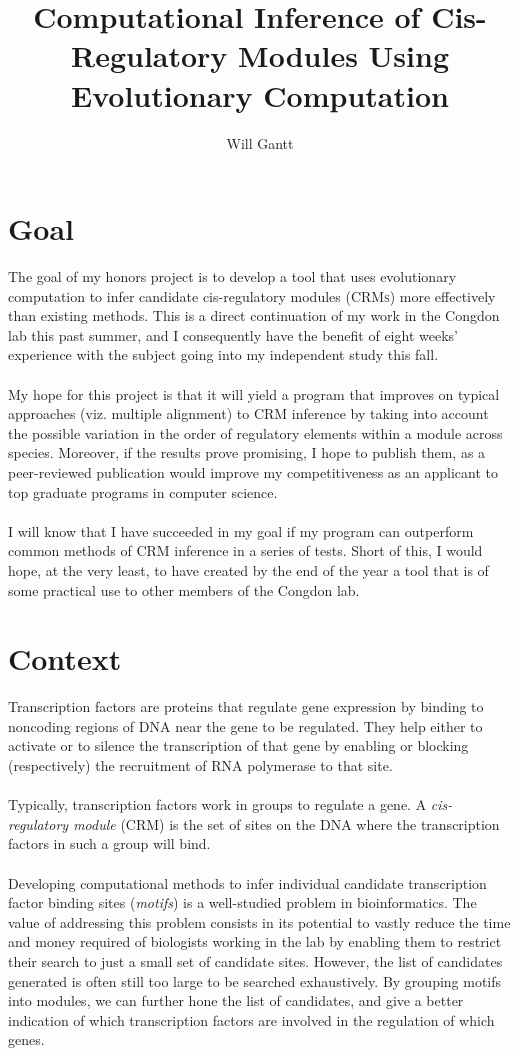 \documentclass[11pt]{article}
\begin{document}
\title{Computational Inference of Cis-Regulatory Modules Using Evolutionary Computation}
\author{Will Gantt}
\maketitle

\section{Goal}
The goal of my honors project is to develop a tool that uses evolutionary computation to infer candidate cis-regulatory modules (\textsc{CRMs}) more effectively than existing methods. This is a direct continuation of my work in the Congdon lab this past summer, and I consequently have the benefit of eight weeks' experience with the subject going into my independent study this fall.
\\
\\
My hope for this project is that it will yield a program that improves on typical approaches (viz. multiple alignment) to \textsc{CRM} inference by taking into account the possible variation in the order of regulatory elements within a module across species. Moreover, if the results prove promising, I hope to publish them, as a peer-reviewed publication would improve my competitiveness as an applicant to top graduate programs in computer science.
\\
\\
I will know that I have succeeded in my goal if my program can outperform common methods of CRM inference in a series of tests. Short of this, I would hope, at the very least, to have created by the end of the year a tool that is of some practical use to other members of the Congdon lab.

\section{Context}
Transcription factors are proteins that regulate gene expression by binding to noncoding regions of DNA near the gene to be regulated. They help either to activate or to silence the transcription of that gene by enabling or blocking (respectively) the recruitment of RNA polymerase to that site.
\\
\\
Typically, transcription factors work in groups to regulate a gene. A \emph{cis-regulatory module} (CRM) is the set of sites on the DNA where the transcription factors in such a group will bind.
\\
\\
Developing computational methods to infer individual candidate transcription factor binding sites (\emph{motifs}) is a well-studied problem in bioinformatics. The value of addressing this problem consists in its potential to vastly reduce the time and money required of biologists working in the lab by enabling them to restrict their search to just a small set of candidate sites. However, the list of candidates generated is often still too large to be searched exhaustively. By grouping motifs into modules, we can further hone the list of candidates, and give a better indication of which transcription factors are involved in the regulation of which genes.
\end{document}
